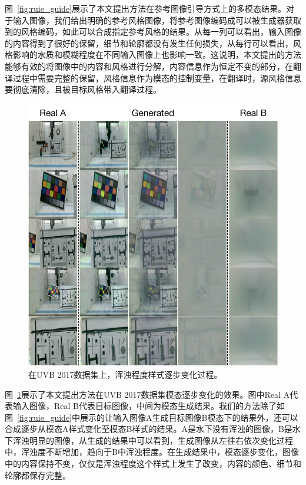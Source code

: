图~\ref{fig:ruie_guide}展示了本文提出方法在参考图像引导方式上的多模态结果。对于输入图像，我们给出明确的参考风格图像，将参考图像编码成可以被生成器获取到的风格编码，如此可以合成指定参考风格的结果。从每一列可以看出，输入图像的内容得到了很好的保留，细节和轮廓都没有发生任何损失，从每行可以看出，风格影响的水质和模糊程度在不同输入图像上也影响一致。这说明，本文提出的方法能够有效的将图像中的内容和风格进行分解，内容信息作为恒定不变的部分，在翻译过程中需要完整的保留，风格信息作为模态的控制变量，在翻译时，源风格信息要彻底清除，且被目标风格带入翻译过程。

\begin{figure}[ht]
    \centering
	\includegraphics[width=\textwidth]{figures/UVB-change.pdf}
	\caption{在UVB 2017数据集上，浑浊程度样式逐步变化过程。}
	\label{fig:uvb-change}
\end{figure}

图~\ref{fig:uvb-change}展示了本文提出方法在UVB 2017数据集模态逐步变化的效果。图中Real A代表输入图像，Real B代表目标图像，中间为模态生成结果。我们的方法除了如图~\ref{fig:ruie_guide}中展示的让输入图像A生成目标图像B模态下的结果外，还可以合成逐步从模态A样式变化至模态B样式的结果。A是水下没有浑浊的图像，B是水下浑浊明显的图像，从生成的结果中可以看到，生成图像从左往右依次变化过程中，浑浊度不断增加，趋向于B中浑浊程度。在生成结果中，模态逐步变化，图像中的内容保持不变，仅仅是浑浊程度这个样式上发生了改变，内容的颜色、细节和轮廓都保存完整。

